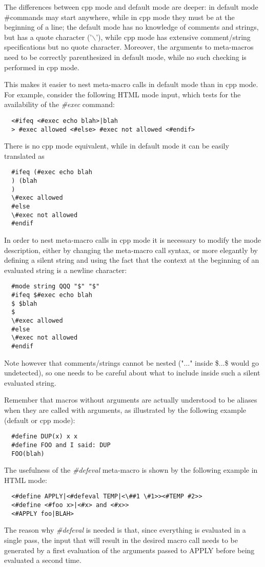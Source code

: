 The differences between cpp mode and default mode are deeper: in default
mode \#commands may start anywhere, while in cpp mode they must be at the
beginning of a line; the default mode has no knowledge of comments and
strings, but has a quote character ('$\backslash$'), while cpp mode has extensive
comment/string specifications but no quote character. Moreover, the
arguments to meta-macros need to be correctly parenthesized in default
mode, while no such checking is performed in cpp mode.


This makes it easier to nest meta-macro calls in default mode than in
cpp mode. For example, consider the following HTML mode input, which 
tests for the availability of the {\it \#exec} command:
\begin{verbatim}
  <#ifeq <#exec echo blah>|blah
  > #exec allowed <#else> #exec not allowed <#endif>
\end{verbatim}
There is no cpp mode equivalent, while in default mode it can be easily 
translated as
\begin{verbatim}
  #ifeq (#exec echo blah
  ) (blah
  )
  \#exec allowed
  #else
  \#exec not allowed
  #endif
\end{verbatim}
In order to nest meta-macro calls in cpp mode it is necessary to modify
the mode description, either by changing the meta-macro call syntax, or
more elegantly by defining a silent string and using the fact that the
context at the beginning of an evaluated string is a newline character:
\begin{verbatim}
  #mode string QQQ "$" "$"
  #ifeq $#exec echo blah
  $ $blah
  $
  \#exec allowed
  #else
  \#exec not allowed
  #endif
\end{verbatim}
Note however that comments/strings cannot be nested ("..." inside
\$...\$ would go undetected), so one needs to be careful about what to 
include inside such a silent evaluated string.


Remember that macros without arguments are actually understood to be
aliases when they are called with arguments, as illustrated by the
following example (default or cpp mode):
\begin{verbatim}
  #define DUP(x) x x
  #define FOO and I said: DUP
  FOO(blah)
\end{verbatim}
The usefulness of the {\it \#defeval} meta-macro is shown by the following
example in HTML mode:
\begin{verbatim}
  <#define APPLY|<#defeval TEMP|<\##1 \#1>><#TEMP #2>>
  <#define <#foo x>|<#x> and <#x>>
  <#APPLY foo|BLAH>
\end{verbatim}
The reason why {\it \#defeval} is needed is that, since everything is
evaluated in a single pass, the input that will result in the desired macro
call needs to be generated by a first evaluation of the arguments passed to
APPLY before being evaluated a second time.


